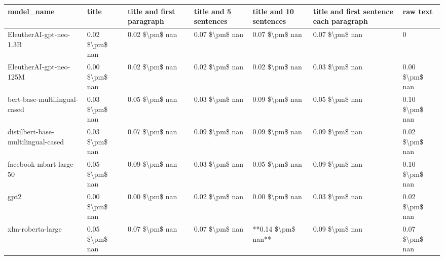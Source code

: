 \begin{tabular}{lllllll}
\toprule
                        model\_name &          title & title and first paragraph & title and 5 sentences & title and 10 sentences & title and first sentence each paragraph &       raw text \\
\midrule
           EleutherAI-gpt-neo-1.3B & 0.02 \$\textbackslash pm\$ nan &            0.02 \$\textbackslash pm\$ nan &        0.07 \$\textbackslash pm\$ nan &         0.07 \$\textbackslash pm\$ nan &                          0.07 \$\textbackslash pm\$ nan &              0 \\
           EleutherAI-gpt-neo-125M & 0.00 \$\textbackslash pm\$ nan &            0.02 \$\textbackslash pm\$ nan &        0.02 \$\textbackslash pm\$ nan &         0.02 \$\textbackslash pm\$ nan &                          0.03 \$\textbackslash pm\$ nan & 0.00 \$\textbackslash pm\$ nan \\
      bert-base-multilingual-cased & 0.03 \$\textbackslash pm\$ nan &            0.05 \$\textbackslash pm\$ nan &        0.03 \$\textbackslash pm\$ nan &         0.09 \$\textbackslash pm\$ nan &                          0.05 \$\textbackslash pm\$ nan & 0.10 \$\textbackslash pm\$ nan \\
distilbert-base-multilingual-cased & 0.03 \$\textbackslash pm\$ nan &            0.07 \$\textbackslash pm\$ nan &        0.09 \$\textbackslash pm\$ nan &         0.09 \$\textbackslash pm\$ nan &                          0.09 \$\textbackslash pm\$ nan & 0.02 \$\textbackslash pm\$ nan \\
           facebook-mbart-large-50 & 0.05 \$\textbackslash pm\$ nan &            0.09 \$\textbackslash pm\$ nan &        0.03 \$\textbackslash pm\$ nan &         0.05 \$\textbackslash pm\$ nan &                          0.09 \$\textbackslash pm\$ nan & 0.10 \$\textbackslash pm\$ nan \\
                              gpt2 & 0.00 \$\textbackslash pm\$ nan &            0.00 \$\textbackslash pm\$ nan &        0.02 \$\textbackslash pm\$ nan &         0.00 \$\textbackslash pm\$ nan &                          0.03 \$\textbackslash pm\$ nan & 0.02 \$\textbackslash pm\$ nan \\
                 xlm-roberta-large & 0.05 \$\textbackslash pm\$ nan &            0.07 \$\textbackslash pm\$ nan &        0.07 \$\textbackslash pm\$ nan &     **0.14 \$\textbackslash pm\$ nan** &                          0.09 \$\textbackslash pm\$ nan & 0.07 \$\textbackslash pm\$ nan \\
\bottomrule
\end{tabular}
